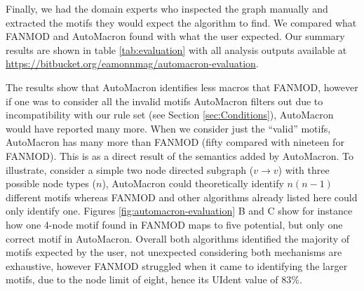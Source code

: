 Finally, we had the domain experts who inspected the graph manually and extracted the motifs they would expect the algorithm to find.
We compared what FANMOD and AutoMacron found with what the user expected.
Our summary results are shown in table \ref{tab:evaluation} with all analysis outputs available at \url{https://bitbucket.org/eamonnmag/automacron-evaluation}.

\begin{table}[!t]
\centering
\vspace{2mm}
\caption{Results of motif identification by the domain experts, FANMOD and AutoMacron. Analysis included: \textbf{MIdent} - the ability of the domain experts to identify motif pictograms generated by the algorithms and match them to the original graph; and \textbf{UIdent} -  the percentage of motifs found by the algorithm with respect to the number identified manually by the domain expert.
Timings for how long it took the domain experts to find motifs was not recorded, hence it's not applicable (n/a) tag.}
\label{tab:evaluation}
\end{table}

The results show that AutoMacron identifies less macros that FANMOD, however if one was to consider all the invalid motifs AutoMacron filters out due to incompatibility with our rule set (see Section \ref{sec:Conditions}), AutoMacron would have reported many more. When we consider just the ``valid'' motifs, AutoMacron has many more than FANMOD (fifty compared with nineteen for FANMOD). 
This is as a direct result of the semantics added by AutoMacron. To illustrate, consider a simple two node directed subgraph ($v \rightarrow v$) with three possible node types ($n$), AutoMacron could theoretically identify $n(n-1)$ different motifs whereas FANMOD and other algorithms already listed here could only identify one.
Figures \ref{fig:automacron-evaluation} B and C show for instance how one 4-node motif found in FANMOD maps to five potential, but only one correct motif in AutoMacron. Overall both algorithms identified the majority of motifs expected by the user, not unexpected considering both mechanisms are exhaustive, however FANMOD struggled when it came to identifying the larger motifs, due to the node limit of eight, hence its UIdent value of 83\%. 

